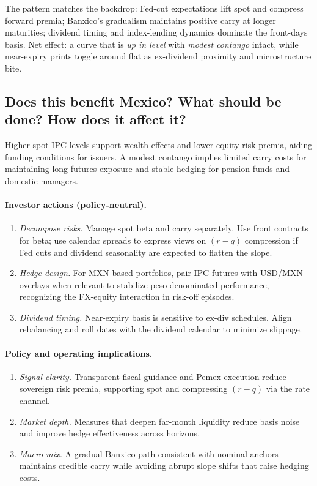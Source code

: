 \documentclass[11pt,a4paper]{article} %
\begin{document}
The pattern matches the backdrop: Fed-cut expectations lift spot and compress forward premia; Banxico's gradualism maintains positive carry at longer maturities; dividend timing and index-lending dynamics dominate the front-days basis. Net effect: a curve that is \emph{up in level} with \emph{modest contango} intact, while near-expiry prints toggle around flat as ex-dividend proximity and microstructure bite.

\subsection{Does this benefit Mexico? What should be done? How does it affect it?}
Higher spot IPC levels support wealth effects and lower equity risk premia, aiding funding conditions for issuers. A modest contango implies limited carry costs for maintaining long futures exposure and stable hedging for pension funds and domestic managers.

\paragraph{Investor actions (policy-neutral).}
\begin{enumerate}
  \item \emph{Decompose risks.} Manage spot beta and carry separately. Use front contracts for beta; use calendar spreads to express views on \((r-q)\) compression if Fed cuts and dividend seasonality are expected to flatten the slope.
  \item \emph{Hedge design.} For MXN-based portfolios, pair IPC futures with USD/MXN overlays when relevant to stabilize peso-denominated performance, recognizing the FX-equity interaction in risk-off episodes.
  \item \emph{Dividend timing.} Near-expiry basis is sensitive to ex-div schedules. Align rebalancing and roll dates with the dividend calendar to minimize slippage.
\end{enumerate}

\paragraph{Policy and operating implications.}
\begin{enumerate}
  \item \emph{Signal clarity.} Transparent fiscal guidance and Pemex execution reduce sovereign risk premia, supporting spot and compressing \((r-q)\) via the rate channel.
  \item \emph{Market depth.} Measures that deepen far-month liquidity reduce basis noise and improve hedge effectiveness across horizons.
  \item \emph{Macro mix.} A gradual Banxico path consistent with nominal anchors maintains credible carry while avoiding abrupt slope shifts that raise hedging costs.
\end{enumerate}
\end{document}
